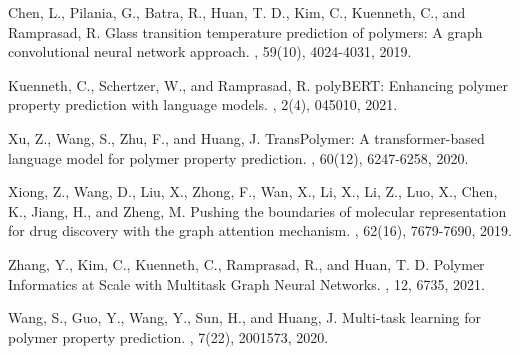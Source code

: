 \documentclass[10pt,twocolumn,letterpaper]{article}
\begin{document}
{\small

\begin{thebibliography}{100}
Chen, L., Pilania, G., Batra, R., Huan, T. D., Kim, C., Kuenneth, C., and Ramprasad, R.
\newblock Glass transition temperature prediction of polymers: A graph convolutional neural network approach. 
, 59(10), 4024-4031, 2019.

Kuenneth, C., Schertzer, W., and Ramprasad, R.
\newblock polyBERT: Enhancing polymer property prediction with language models.
, 2(4), 045010, 2021.

Xu, Z., Wang, S., Zhu, F., and Huang, J.
\newblock TransPolymer: A transformer-based language model for polymer property prediction.
, 60(12), 6247-6258, 2020.

Xiong, Z., Wang, D., Liu, X., Zhong, F., Wan, X., Li, X., Li, Z., Luo, X., Chen, K., Jiang, H., and Zheng, M.
\newblock Pushing the boundaries of molecular representation for drug discovery with the graph attention mechanism.
, 62(16), 7679-7690, 2019.

Zhang, Y., Kim, C., Kuenneth, C., Ramprasad, R., and Huan, T. D.
\newblock Polymer Informatics at Scale with Multitask Graph Neural Networks.
, 12, 6735, 2021.

Wang, S., Guo, Y., Wang, Y., Sun, H., and Huang, J.
\newblock Multi-task learning for polymer property prediction.
, 7(22), 2001573, 2020.
\end{thebibliography}
}
\end{document}
